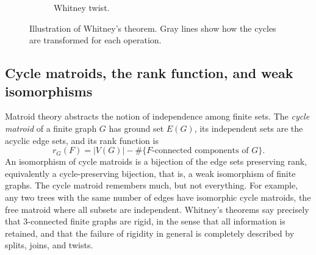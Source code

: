 \documentclass{article}
\theoremstyle{plain}
\theoremstyle{definition}
\begin{document}
\begin{figure}[ht!]
\begin{subfigure}[t]{0.32\textwidth}
\begin{center}
\end{center}
\caption{
Whitney twist.
}
\label{fig:opc}
\end{subfigure}
\caption{Illustration of Whitney's theorem. Gray lines show how the cycles are transformed for each operation.}
\label{fig:weakly}
\end{figure}


\subsection{Cycle matroids, the rank function, and weak isomorphisms}\label{subsec:cycle_matroids_and_rank}

Matroid theory abstracts the notion of independence among finite sets. The \emph{cycle matroid} of a finite graph $G$ has ground set $E(G)$, its independent sets are the acyclic edge sets, and its rank function is
\[
    r_G(F)=|V(G)|-\#\{\text{$F$-connected components of $G$}\}.
\]
An isomorphism of cycle matroids is a bijection of the edge sets preserving rank, equivalently a cycle-preserving bijection, that is, a weak isomorphism of finite graphs. The cycle matroid remembers much, but not everything. For example, any two trees with the same number of edges have isomorphic cycle matroids, the free matroid where all subsets are independent. Whitney's theorems say precisely that $3$-connected finite graphs are rigid, in the sense that all information is retained, and that the failure of rigidity in general is completely described by splits, joins, and twists.
\end{document}

